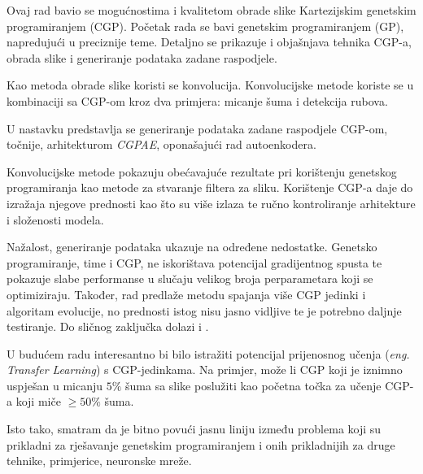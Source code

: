 Ovaj rad bavio se mogućnostima i kvalitetom obrade slike Kartezijskim genetskim programiranjem (CGP).
Početak rada se bavi genetskim programiranjem (GP), napredujući u preciznije teme.
Detaljno se prikazuje i objašnjava tehnika CGP-a, obrada slike i generiranje podataka zadane raspodjele.

Kao metoda obrade slike koristi se konvolucija.
Konvolucijske metode koriste se u kombinaciji sa CGP-om kroz dva primjera: micanje šuma i detekcija rubova.

U nastavku predstavlja se generiranje podataka zadane raspodjele CGP-om, točnije, arhitekturom \emph{CGPAE}, oponašajući rad autoenkodera.

Konvolucijske metode pokazuju obećavajuće rezultate pri korištenju genetskog programiranja kao metode za stvaranje filtera za sliku.
Korištenje CGP-a daje do izražaja njegove prednosti kao što su više izlaza te ručno kontroliranje arhitekture i složenosti modela.

Nažalost, generiranje podataka ukazuje na određene nedostatke.
Genetsko programiranje, time i CGP, ne iskorištava potencijal gradijentnog spusta te pokazuje slabe performanse u slučaju velikog broja perparametara koji se optimiziraju.
Također, rad predlaže metodu spajanja više CGP jedinki i algoritam evolucije, no prednosti istog nisu jasno vidljive te je potrebno daljnje testiranje.
Do sličnog zaključka dolazi i \cite{conv_gen_programming}.

U budućem radu interesantno bi bilo istražiti potencijal prijenosnog učenja (\emph{eng. Transfer Learning}) s CGP-jedinkama.
Na primjer, može li CGP koji je iznimno uspješan u micanju $5\%$ šuma sa slike poslužiti kao početna točka za učenje CGP-a koji miče $\geq 50\%$ šuma.

Isto tako, smatram da je bitno povući jasnu liniju između problema koji su prikladni za rješavanje genetskim programiranjem i onih prikladnijih za druge tehnike, primjerice, neuronske mreže.
